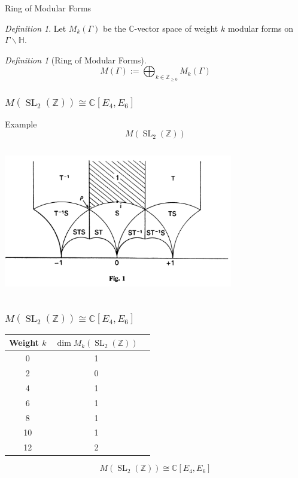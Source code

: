 \documentclass{beamer}
\theoremstyle{remark}
\newtheorem{defn}[thm]{Definition}
\newcommand\BC{{\mathbb C}}
\newcommand\BBZ{{\mathbb Z}}
\newcommand\BZ{{\mathbb Z}}
\newcommand{\SL}{\operatorname{SL}}
\begin{document}

\begin{frame}{Ring of Modular Forms}

\begin{defn}
  Let $M_k(\Gamma)$ be the $\BC$-vector space of weight $k$ modular forms on $\Gamma \backslash \mathbb{H}$.
\end{defn}

\begin{defn}[Ring of Modular Forms]
\[
	M(\Gamma) := \bigoplus_{k \in \BZ_{\geq 0}} M_k(\Gamma)
\]
\end{defn}

\end{frame}


\begin{frame}
\frametitle{$M(\SL_2(\BZ)) \cong \BC[E_4,E_6]$}

\begin{block}{Example}
\[
	M(\SL_2(\BZ))
\]
\end{block}

  \begin{center}
    \includegraphics[width=10cm, height=6.5cm]{pics/fun-domain-SL2.png}
  \end{center}

\end{frame}


\begin{frame}
\frametitle{$M(\SL_2(\BZ)) \cong \BC[E_4,E_6]$}


\begin{center}
\begin{tabular}{ |c| c| c|}
\hline
Weight $k$  & $\dim M_{k}(\SL_2(\BBZ))$  \\ 
\hline
0& 1 \\ 
2& 0 \\  
4& 1 \\
6& 1 \\
8& 1 \\
10& 1 \\
12& 2 \\
\hline
\end{tabular}
\end{center}

\[
	M(\SL_2(\BZ)) \cong \BC[E_4,E_6]
\]
\end{frame}
\end{document}
